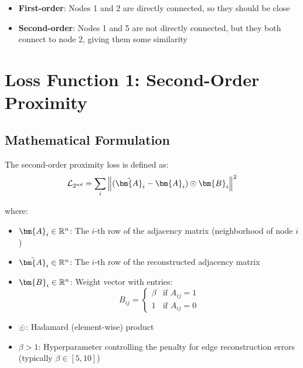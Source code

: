 \begin{notechapter}
\begin{example}
\begin{center}
\end{center}

\begin{itemize}
    \item \textbf{First-order}: Nodes 1 and 2 are directly connected, so they should be close
    \item \textbf{Second-order}: Nodes 1 and 5 are not directly connected, but they both connect to node 2, giving them some similarity
\end{itemize}
\end{example}

\section{Loss Function 1: Second-Order Proximity}

\subsection{Mathematical Formulation}

The second-order proximity loss is defined as:
\begin{equation}
\mathcal{L}_{2^{nd}} = \sum_{i} \norm{(\tilde{\bm{A}}_i - \bm{A}_i) \hadamard \bm{B}_i}^2
\label{graph-autoencoders:eq:l2_loss}
\end{equation}

where:
\begin{itemize}
    \item $\bm{A}_i \in \R^n$: The $i$-th row of the adjacency matrix (neighborhood of node $i$)
    \item $\tilde{\bm{A}}_i \in \R^n$: The $i$-th row of the reconstructed adjacency matrix
    \item $\bm{B}_i \in \R^n$: Weight vector with entries:
    \begin{equation}
    B_{ij} = \begin{cases}
    \beta & \text{if } A_{ij} = 1 \\
    1 & \text{if } A_{ij} = 0
    \end{cases}
    \end{equation}
    \item $\odot$: Hadamard (element-wise) product
    \item $\beta > 1$: Hyperparameter controlling the penalty for edge reconstruction errors (typically $\beta \in [5, 10]$)
\end{itemize}


\end{notechapter}
